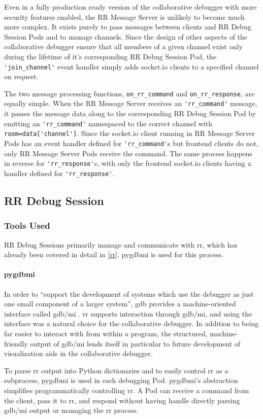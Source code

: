 \documentclass[12pt]{article}
\begin{document}
Even in a fully production ready version of the collaborative debugger
with more security features enabled, the RR Message Server is unlikely
to become much more complex.  It exists purely to pass messages
between clients and RR Debug Session Pods and to manage channels.
Since the design of other aspects of the collaborative debugger ensure
that all members of a given channel exist only during the lifetime of
it's corresponding RR Debug Session Pod, the
\lstinline{'join_channel'} event handler simply adds socket.io clients
to a specified channel on request.
\par

The two message processing functions, \lstinline{on_rr_command} and
\lstinline{on_rr_response}, are equally simple.  When the RR Message
Server receives an \lstinline{'rr_command'} message, it passes the
message data along to the corresponding RR Debug Session Pod by
emitting an \lstinline{'rr_command'} namespaced to the correct channel
with \lstinline{room=data['channel']}.  Since the socket.io client
running in RR Message Server Pods has an event handler defined for
\lstinline{'rr_command'}s but frontend clients do not, only RR Message
Server Pods receive the command.  The same process happens in reverse
for \lstinline{'rr_response'}s, with only the frontend socket.io
clients having a handler defined for \lstinline{'rr_response'}.

\subsection{RR Debug Session} \label{rrpods}

\subsubsection{Tools Used}

RR Debug Sessions primarily manage and communicate with rr, which has
already been covered in detail in \ref{rr}.  pygdbmi is used for this
process.

\paragraph{pygdbmi}

In order to ``support the development of systems which use the
debugger as just one small component of a larger system'', gdb
provides a machine-oriented interface called gdb/mi \cite{gdbman}. rr
supports interaction through gdb/mi, and using the interface was a
natural choice for the collaborative debugger.  In addition to being
far easier to interact with from within a program, the structured,
machine-friendly output of gdb/mi lends itself in particular to future
development of visualization aids in the collaborative debugger.
\par
To parse rr output into Python dictionaries and to easily control rr
as a subprocess, pygdbmi \cite{pygdbmi} is used in each debugging Pod.
pygdbmi's abstraction simplifies programmatically controlling rr.  A
Pod can receive a command from the client, pass it to rr, and respond
without having handle directly parsing gdb/mi output or managing the
rr process.
\end{document}
